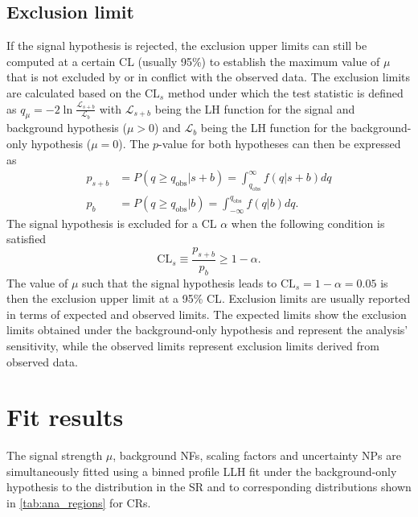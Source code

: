 \documentclass[../thesis.tex]{subfiles}
\begin{document}
\subsection{Exclusion limit}
If the signal hypothesis is rejected, the exclusion upper limits can still be computed at a certain \acs{CL} (usually 95\%) to establish the maximum value of $\mu$ that is not excluded by or in conflict with the observed data. The exclusion limits are calculated based on the $\text{CL}_s$ method \citep{cls1,cls2} under which the test statistic is defined as $q_\mu = -2 \ln \frac{\mathcal{L}_{s+b}}{\mathcal{L}_b}$ with $\mathcal{L}_{s+b}$ being the \acs{LH} function for the signal and background hypothesis ($\mu>0$) and $\mathcal{L}_b$ being the \acs{LH} function for the background-only hypothesis ($\mu=0$). The $p$-value for both hypotheses can then be expressed as
\begin{equation}
\begin{aligned}
p_{s+b} &= P(q\geq q_\text{obs}|s+b)
= \int^\infty_{q_\text{obs}} f(q|s+b)dq \\
p_b 	&= P(q\geq q_\text{obs}|b)
= \int^{q_\text{obs}}_{-\infty} f(q|b)dq.
\end{aligned}
\end{equation}
The signal hypothesis is excluded for a \acs{CL} $\alpha$ when the following condition is satisfied
\begin{equation}
\text{CL}_s \equiv \frac{p_{s+b}}{p_b} \geq 1-\alpha.
\end{equation}
The value of $\mu$ such that the signal hypothesis leads to $\text{CL}_s = 1-\alpha = 0.05$ is then the exclusion upper limit at a 95\% \acs{CL}. Exclusion limits are usually reported in terms of expected and observed limits. The expected limits show the exclusion limits obtained under the background-only hypothesis and represent the analysis' sensitivity, while the observed limits represent exclusion limits derived from observed data.

\section{Fit results}
\label{sec:results}

The signal strength $\mu$, background \acs{NF}s, \ttW scaling factors and uncertainty \acs{NP}s are simultaneously fitted using a binned profile \acs{LLH} fit under the background-only hypothesis to the \HT distribution in the \acs{SR} and to corresponding distributions shown in \autoref{tab:ana_regions} for \acs{CR}s. 
\end{document}
